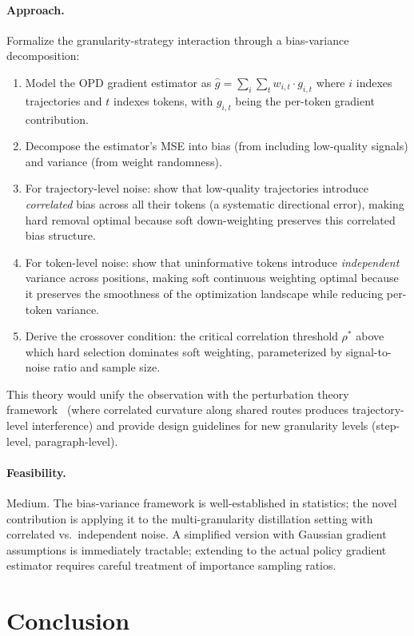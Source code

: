 \documentclass[11pt,a4paper]{article}
\begin{document}
\paragraph{Approach.} Formalize the granularity-strategy interaction through a bias-variance decomposition:
\begin{enumerate}
\item Model the OPD gradient estimator as $\hat{g} = \sum_i \sum_t w_{i,t} \cdot g_{i,t}$ where $i$ indexes trajectories and $t$ indexes tokens, with $g_{i,t}$ being the per-token gradient contribution.
\item Decompose the estimator's MSE into bias (from including low-quality signals) and variance (from weight randomness).
\item For trajectory-level noise: show that low-quality trajectories introduce \emph{correlated} bias across all their tokens (a systematic directional error), making hard removal optimal because soft down-weighting preserves this correlated bias structure.
\item For token-level noise: show that uninformative tokens introduce \emph{independent} variance across positions, making soft continuous weighting optimal because it preserves the smoothness of the optimization landscape while reducing per-token variance.
\item Derive the crossover condition: the critical correlation threshold $\rho^*$ above which hard selection dominates soft weighting, parameterized by signal-to-noise ratio and sample size.
\end{enumerate}
This theory would unify the observation with the perturbation theory framework~\cite{yang2026perturbation} (where correlated curvature along shared routes produces trajectory-level interference) and provide design guidelines for new granularity levels (step-level, paragraph-level).

\paragraph{Feasibility.} Medium. The bias-variance framework is well-established in statistics; the novel contribution is applying it to the multi-granularity distillation setting with correlated vs.\ independent noise. A simplified version with Gaussian gradient assumptions is immediately tractable; extending to the actual policy gradient estimator requires careful treatment of importance sampling ratios.

\section{Conclusion}
\end{document}
